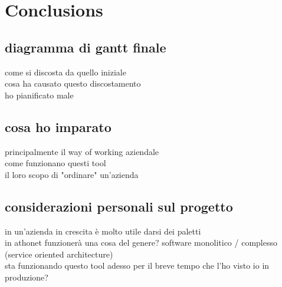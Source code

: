 \chapter{Conclusions}
\label{conclusions}

\section{diagramma di gantt finale}
	come si discosta da quello iniziale\\
	cosa ha causato questo discostamento\\
	ho pianificato male

\section{cosa ho imparato}
	principalmente il way of working aziendale\\
	come funzionano questi tool\\
	il loro scopo di "ordinare" un'azienda

\section{considerazioni personali sul progetto}
	in un'azienda in crescita è molto utile darsi dei paletti\\
	in athonet funzionerà una cosa del genere?  software monolitico / complesso (service oriented architecture)\\
	sta funzionando questo tool adesso per il breve tempo che l'ho visto io in produzione?

